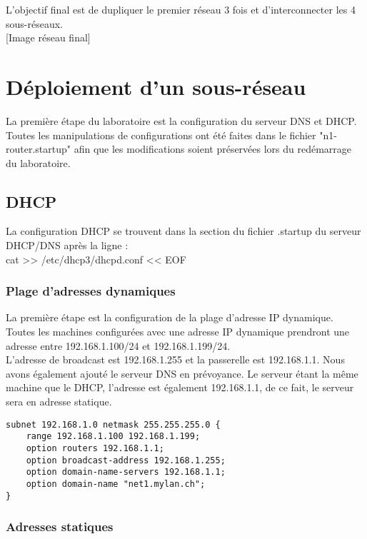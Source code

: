 \documentclass{article}
\begin{document}
L'objectif final est de dupliquer le premier réseau 3 fois et d'interconnecter les 4 sous-réseaux.\\

[Image réseau final]


\section{Déploiement d'un sous-réseau}

La première étape du laboratoire est la configuration du serveur DNS et DHCP. Toutes les manipulations de configurations ont été faites dans le fichier "n1-router.startup" afin que les modifications soient préservées lors du redémarrage du laboratoire.

\subsection{DHCP}

La configuration DHCP se trouvent dans la section du fichier .startup du serveur DHCP/DNS après la ligne : \\

cat >> /etc/dhcp3/dhcpd.conf << EOF

\subsubsection{Plage d'adresses dynamiques}

La première étape est la configuration de la plage d'adresse IP dynamique. Toutes les machines configurées avec une adresse IP dynamique prendront une adresse entre 192.168.1.100/24 et 192.168.1.199/24.\\

L'adresse de broadcast est 192.168.1.255 et la passerelle est 192.168.1.1. Nous avons également ajouté le serveur DNS en prévoyance. Le serveur étant la même machine que le DHCP, l'adresse est également 192.168.1.1, de ce fait, le serveur sera en adresse statique.\\

\begin{lstlisting}
subnet 192.168.1.0 netmask 255.255.255.0 {
	range 192.168.1.100 192.168.1.199;
	option routers 192.168.1.1;
	option broadcast-address 192.168.1.255;
	option domain-name-servers 192.168.1.1;
	option domain-name "net1.mylan.ch";
}
\end{lstlisting}


\subsubsection{Adresses statiques}
\end{document}
